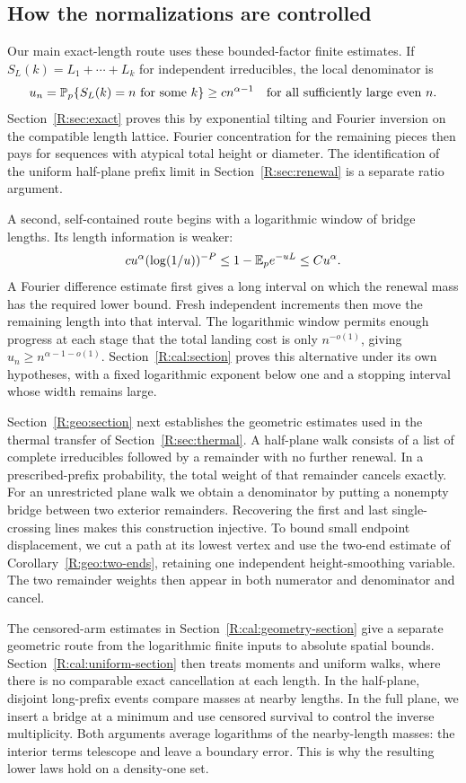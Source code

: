 \subsection*{How the normalizations are controlled}
Our main exact-length route uses these bounded-factor finite estimates. If $S_L(k)=L_1+\cdots+L_k$ for independent irreducibles, the local denominator is
\[
 u_n=\mathbb P_p\{S_L(k)=n\text{ for some }k\}\ge c n^{\alpha-1}
 \quad\text{for all sufficiently large even }n.
\]
Section~\ref{R:sec:exact} proves this by exponential tilting and Fourier inversion on the compatible length lattice. Fourier concentration for the remaining pieces then pays for sequences with atypical total height or diameter. The identification of the uniform half-plane prefix limit in Section~\ref{R:sec:renewal} is a separate ratio argument.

A second, self-contained route begins with a logarithmic window of bridge lengths. Its length information is weaker:
\[
 c u^\alpha(\log(1/u))^{-P}\le 1-\mathbb E_p e^{-uL}\le C u^\alpha.
\]
A Fourier difference estimate first gives a long interval on which the renewal mass has the required lower bound. Fresh independent increments then move the remaining length into that interval. The logarithmic window permits enough progress at each stage that the total landing cost is only $n^{-o(1)}$, giving $u_n\ge n^{\alpha-1-o(1)}$. Section~\ref{R:cal:section} proves this alternative under its own hypotheses, with a fixed logarithmic exponent below one and a stopping interval whose width remains large.

Section~\ref{R:geo:section} next establishes the geometric estimates used in the thermal transfer of Section~\ref{R:sec:thermal}. A half-plane walk consists of a list of complete irreducibles followed by a remainder with no further renewal. In a prescribed-prefix probability, the total weight of that remainder cancels exactly. For an unrestricted plane walk we obtain a denominator by putting a nonempty bridge between two exterior remainders. Recovering the first and last single-crossing lines makes this construction injective. To bound small endpoint displacement, we cut a path at its lowest vertex and use the two-end estimate of Corollary~\ref{R:geo:two-ends}, retaining one independent height-smoothing variable. The two remainder weights then appear in both numerator and denominator and cancel.

The censored-arm estimates in Section~\ref{R:cal:geometry-section} give a separate geometric route from the logarithmic finite inputs to absolute spatial bounds. Section~\ref{R:cal:uniform-section} then treats moments and uniform walks, where there is no comparable exact cancellation at each length. In the half-plane, disjoint long-prefix events compare masses at nearby lengths. In the full plane, we insert a bridge at a minimum and use censored survival to control the inverse multiplicity. Both arguments average logarithms of the nearby-length masses: the interior terms telescope and leave a boundary error. This is why the resulting lower laws hold on a density-one set.

